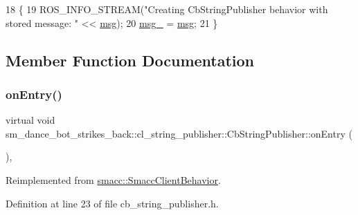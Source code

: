 \begin{DoxyCode}
18     \{
19         ROS\_INFO\_STREAM(\textcolor{stringliteral}{"Creating CbStringPublisher behavior with stored message: "} << 
      \hyperlink{namespacebattery__monitor__node_ab1920c64448816edd4064e494275fdff}{msg});
20         \hyperlink{classsm__dance__bot__strikes__back_1_1cl__string__publisher_1_1CbStringPublisher_aff05ac35bd920ef24fd9b6464fe83eae}{msg\_} = \hyperlink{namespacebattery__monitor__node_ab1920c64448816edd4064e494275fdff}{msg};
21     \}
\end{DoxyCode}


\subsection{Member Function Documentation}
\mbox{\label{classsm__dance__bot__strikes__back_1_1cl__string__publisher_1_1CbStringPublisher_a2c3963143fe180a5e5f939362857d2e0}} 
\subsubsection{\texorpdfstring{on\+Entry()}{onEntry()}}
{\footnotesize\ttfamily virtual void sm\+\_\+dance\+\_\+bot\+\_\+strikes\+\_\+back\+::cl\+\_\+string\+\_\+publisher\+::\+Cb\+String\+Publisher\+::on\+Entry (\begin{DoxyParamCaption}{ }\end{DoxyParamCaption})\hspace{0.3cm}{\ttfamily [inline]}, {\ttfamily [virtual]}}



Reimplemented from \hyperlink{classsmacc_1_1SmaccClientBehavior_ad5d3e1f1697c3cfe66c94cadba948493}{smacc\+::\+Smacc\+Client\+Behavior}.



Definition at line 23 of file cb\+\_\+string\+\_\+publisher.\+h.



